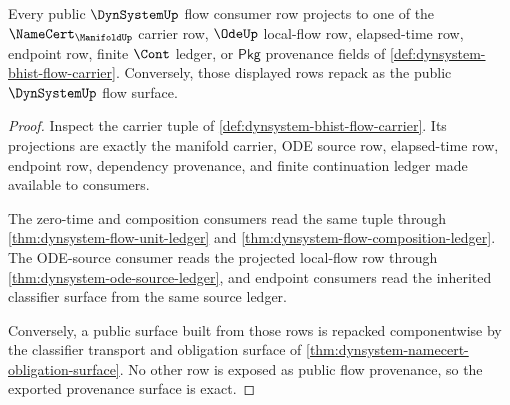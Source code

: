 \begin{theorem}
\label{thm:dynsystem-flow-provenance-exactness}
Every public $\DynSystemUp$ flow consumer row projects to one of the $\NameCert_{\ManifoldUp}$ carrier row, $\OdeUp$ local-flow row, elapsed-time row, endpoint row, finite $\Cont$ ledger, or $\mathsf{Pkg}$ provenance fields of \autoref{def:dynsystem-bhist-flow-carrier}. Conversely, those displayed rows repack as the public $\DynSystemUp$ flow surface.
\end{theorem}
\begin{proof}
Inspect the carrier tuple of
\autoref{def:dynsystem-bhist-flow-carrier}. Its projections are exactly the
manifold carrier, ODE source row, elapsed-time row, endpoint row, dependency
provenance, and finite continuation ledger made available to consumers.

The zero-time and composition consumers read the same tuple through
\autoref{thm:dynsystem-flow-unit-ledger} and
\autoref{thm:dynsystem-flow-composition-ledger}. The ODE-source consumer reads
the projected local-flow row through \autoref{thm:dynsystem-ode-source-ledger},
and endpoint consumers read the inherited classifier surface from the same
source ledger.

Conversely, a public surface built from those rows is repacked componentwise
by the classifier transport and obligation surface of
\autoref{thm:dynsystem-namecert-obligation-surface}. No other row is exposed
as public flow provenance, so the exported provenance surface is exact.
\end{proof}

